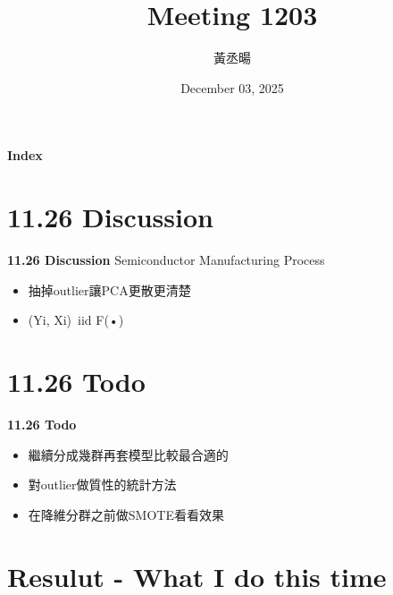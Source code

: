 \documentclass[12pt,aspectratio=43]{beamer}
\title{Meeting 1203}
\author{黃丞暘}
\institute{國立東華大學應數統計所}
\date{December 03, 2025}
\begin{document}
\begin{frame}
  \titlepage
\end{frame}

\begin{frame}{\textbf{Index}}
  \tableofcontents
\end{frame}

\section{11.26 Discussion}

\begin{frame}{\textbf{11.26 Discussion}}
\linespread{1.5}
  Semiconductor Manufacturing Process
  \begin{itemize}
    \item 抽掉outlier讓PCA更散更清楚
  \end{itemize}
  \begin{itemize}
    \item (Yi, Xi)~iid F(•)
  \end{itemize}
\end{frame}

\section{11.26 Todo}

\begin{frame}{\textbf{11.26 Todo}}
\linespread{1.5}
  \begin{itemize}[]
    \item 繼續分成幾群再套模型比較最合適的
  \end{itemize}
  \begin{itemize}[]
    \item 對outlier做質性的統計方法
  \end{itemize}
  \begin{itemize}[]
    \item 在降維分群之前做SMOTE看看效果
  \end{itemize}
\end{frame}

\section{Resulut - What I do this time}
\end{document}

